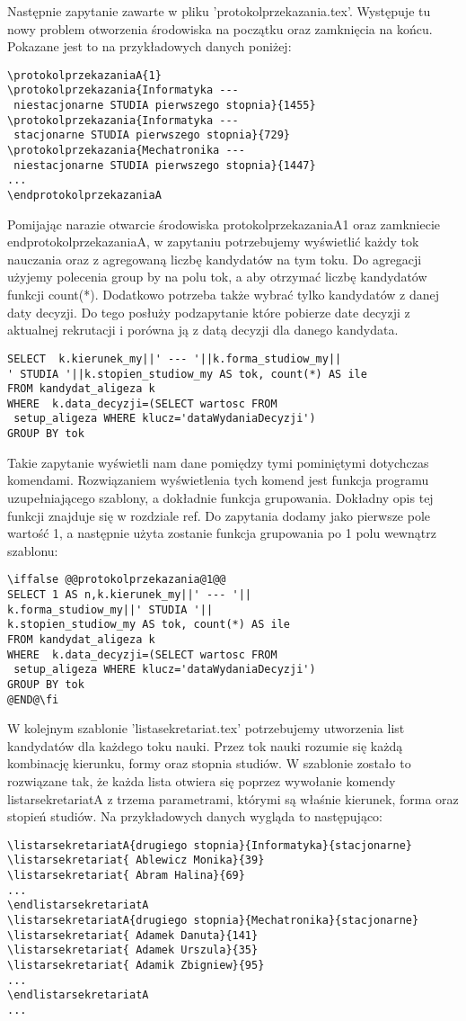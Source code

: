 Następnie zapytanie zawarte w pliku 'protokolprzekazania.tex'. Występuje tu nowy problem otworzenia środowiska na początku oraz zamknięcia na końcu. Pokazane jest to na przykładowych danych poniżej:
 \begin{verbatim}
\protokolprzekazaniaA{1}
\protokolprzekazania{Informatyka ---
 niestacjonarne STUDIA pierwszego stopnia}{1455}
\protokolprzekazania{Informatyka ---
 stacjonarne STUDIA pierwszego stopnia}{729}
\protokolprzekazania{Mechatronika ---
 niestacjonarne STUDIA pierwszego stopnia}{1447}
...
\endprotokolprzekazaniaA        
\end{verbatim}
Pomijając narazie otwarcie środowiska protokolprzekazaniaA{1} oraz zamkniecie endprotokolprzekazaniaA, w zapytaniu potrzebujemy wyświetlić każdy tok nauczania oraz z agregowaną liczbę kandydatów na tym toku. Do agregacji użyjemy polecenia group by na polu tok, a aby otrzymać liczbę kandydatów funkcji count(*). Dodatkowo potrzeba także wybrać tylko kandydatów z danej daty decyzji. Do tego posłuży podzapytanie które pobierze date decyzji z aktualnej rekrutacji i porówna ją z datą decyzji dla danego kandydata. 
 \begin{verbatim}
SELECT  k.kierunek_my||' --- '||k.forma_studiow_my||
' STUDIA '||k.stopien_studiow_my AS tok, count(*) AS ile
FROM kandydat_aligeza k
WHERE  k.data_decyzji=(SELECT wartosc FROM
 setup_aligeza WHERE klucz='dataWydaniaDecyzji') 
GROUP BY tok
\end{verbatim}
Takie zapytanie wyświetli nam dane pomiędzy tymi pominiętymi dotychczas komendami. 
Rozwiązaniem wyświetlenia tych komend jest funkcja programu uzupełniającego szablony, a dokładnie funkcja grupowania. Dokładny opis tej funkcji znajduje się w rozdziale ref. Do zapytania dodamy jako pierwsze pole wartość 1, a następnie użyta zostanie funkcja grupowania po 1 polu wewnątrz szablonu:
 \begin{verbatim}
\iffalse @@protokolprzekazania@1@@
SELECT 1 AS n,k.kierunek_my||' --- '||
k.forma_studiow_my||' STUDIA '||
k.stopien_studiow_my AS tok, count(*) AS ile
FROM kandydat_aligeza k
WHERE  k.data_decyzji=(SELECT wartosc FROM
 setup_aligeza WHERE klucz='dataWydaniaDecyzji') 
GROUP BY tok
@END@\fi
\end{verbatim}

W kolejnym szablonie 'listasekretariat.tex' potrzebujemy utworzenia list kandydatów dla każdego toku nauki. Przez tok nauki rozumie się każdą kombinację kierunku, formy oraz stopnia studiów. W szablonie zostało to rozwiązane tak, że każda lista otwiera się poprzez wywołanie komendy listarsekretariatA z trzema parametrami, którymi są właśnie kierunek, forma oraz stopień studiów. Na przykładowych danych wygląda to następująco:
 \begin{verbatim}
\listarsekretariatA{drugiego stopnia}{Informatyka}{stacjonarne}
\listarsekretariat{ Ablewicz Monika}{39}
\listarsekretariat{ Abram Halina}{69}
...
\endlistarsekretariatA
\listarsekretariatA{drugiego stopnia}{Mechatronika}{stacjonarne}
\listarsekretariat{ Adamek Danuta}{141}
\listarsekretariat{ Adamek Urszula}{35}
\listarsekretariat{ Adamik Zbigniew}{95}
...
\endlistarsekretariatA
...
\end{verbatim}

